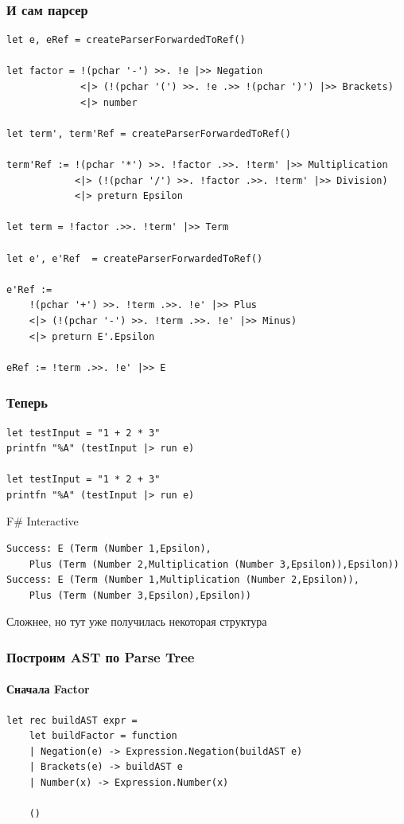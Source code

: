 \documentclass[xetex,mathserif,serif]{beamer}
\begin{document}
    \begin{frame}[fragile]
        \frametitle{И сам парсер}
        \begin{scriptsize}
            \begin{verbatim}
let e, eRef = createParserForwardedToRef()

let factor = !(pchar '-') >>. !e |>> Negation
             <|> (!(pchar '(') >>. !e .>> !(pchar ')') |>> Brackets)
             <|> number

let term', term'Ref = createParserForwardedToRef()

term'Ref := !(pchar '*') >>. !factor .>>. !term' |>> Multiplication
            <|> (!(pchar '/') >>. !factor .>>. !term' |>> Division)
            <|> preturn Epsilon

let term = !factor .>>. !term' |>> Term

let e', e'Ref  = createParserForwardedToRef()

e'Ref :=
    !(pchar '+') >>. !term .>>. !e' |>> Plus
    <|> (!(pchar '-') >>. !term .>>. !e' |>> Minus)
    <|> preturn E'.Epsilon

eRef := !term .>>. !e' |>> E
            \end{verbatim}
        \end{scriptsize}
    \end{frame}

    \begin{frame}[fragile]
        \frametitle{Теперь}
        \begin{verbatim}
let testInput = "1 + 2 * 3"
printfn "%A" (testInput |> run e)

let testInput = "1 * 2 + 3"
printfn "%A" (testInput |> run e)
        \end{verbatim}

        \begin{exampleblock}{F\# Interactive}
            \begin{verbatim}
Success: E (Term (Number 1,Epsilon),
    Plus (Term (Number 2,Multiplication (Number 3,Epsilon)),Epsilon))
Success: E (Term (Number 1,Multiplication (Number 2,Epsilon)),
    Plus (Term (Number 3,Epsilon),Epsilon))
            \end{verbatim}
        \end{exampleblock}
        Сложнее, но тут уже получилась некоторая структура
    \end{frame}

    \begin{frame}[fragile]
        \frametitle{Построим AST по Parse Tree}
        \framesubtitle{Сначала Factor}
        \begin{verbatim}
let rec buildAST expr =
    let buildFactor = function
    | Negation(e) -> Expression.Negation(buildAST e)
    | Brackets(e) -> buildAST e
    | Number(x) -> Expression.Number(x)

    ()
        \end{verbatim}
    \end{frame}
\end{document}
